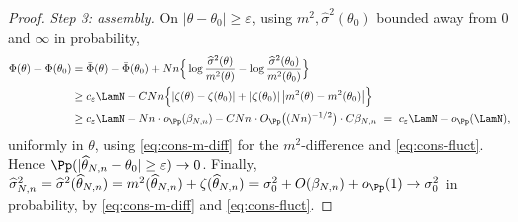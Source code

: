 \begin{proof}
\emph{Step 3: assembly.}
On $|\theta-\theta_0|\ge\varepsilon$, using $m^2,\widehat\sigma^2(\theta_0)$
bounded away from $0$ and $\infty$ in probability,
\begin{align*}
 \Phi(\theta)-\Phi(\theta_0)
 &=\bar\Phi(\theta)-\bar\Phi(\theta_0)
 +Nn\Big\{\log\frac{\widehat\sigma^2(\theta)}{m^2(\theta)}
 -\log\frac{\widehat\sigma^2(\theta_0)}{m^2(\theta_0)}\Big\}\\
 &\ge c_\varepsilon\LamN
 -CNn\Big\{|\zeta(\theta)-\zeta(\theta_0)|
 +|\zeta(\theta_0)|\,\big|m^2(\theta)-m^2(\theta_0)\big|\Big\}\\
 &\ge c_\varepsilon\LamN
 -Nn\cdot o_{\Pp}(\beta_{N,n})
 -CNn\cdot O_{\Pp}\big((Nn)^{-1/2}\big)\cdot C\beta_{N,n}
 \ =\ c_\varepsilon\LamN-o_{\Pp}(\LamN),
\end{align*}
uniformly in $\theta$, using \eqref{eq:cons-m-diff} for the
$m^2$-difference and \eqref{eq:cons-fluct}. Hence
$\Pp(|\widehat\theta_{N,n}-\theta_0|\ge\varepsilon)\to0$. Finally,
$\widehat\sigma^2_{N,n}=\widehat\sigma^2(\widehat\theta_{N,n})
=m^2(\widehat\theta_{N,n})+\zeta(\widehat\theta_{N,n})
=\sigma_0^2+O(\beta_{N,n})+o_{\Pp}(1)\to\sigma_0^2$
in probability, by \eqref{eq:cons-m-diff} and \eqref{eq:cons-fluct}.
\end{proof}
